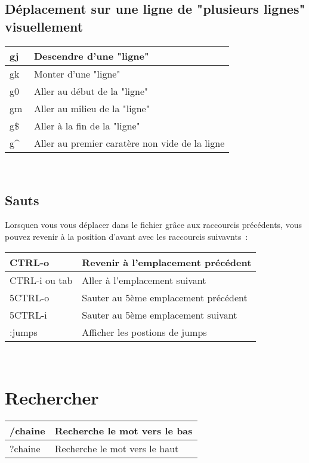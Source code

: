 \documentclass{article}
\begin{document}
\subsection{Déplacement sur une ligne de "plusieurs lignes" visuellement }
\begin{tabular}{|p{3cm}| l| }
\hline
gj & Descendre d'une "ligne"\\ \hline
gk & Monter d'une "ligne"\\ \hline
g0 & Aller au début de la "ligne"\\ \hline
gm & Aller au milieu de la "ligne"\\ \hline
g\$ & Aller à la fin de la "ligne"\\ \hline
g\^~ & Aller au premier caratère non vide de la ligne\\ \hline
\end{tabular}\\

\subsection{Sauts}
Lorsquen vous vous déplacer dans le fichier grâce aux raccourcis précédents, vous pouvez revenir à la position d'avant avec les raccourcis suivavnts~: \\


\begin{tabular}{|p{3cm}| l| }
\hline
CTRL-o & Revenir à l'emplacement précédent\\ \hline
CTRL-i ou tab & Aller à l'emplacement suivant\\ \hline
5CTRL-o & Sauter au 5ème emplacement précédent\\ \hline
5CTRL-i & Sauter au 5ème emplacement suivant\\ \hline
:jumps & Afficher les postions de jumps\\ \hline
\end{tabular}\\

\section{Rechercher}
\begin{tabular}{|p{3cm}| l| }
\hline
/chaine & Recherche le mot vers le bas\\ \hline
?chaine & Recherche le mot vers le haut\\ \hline
\end{tabular}\\
\end{document}
